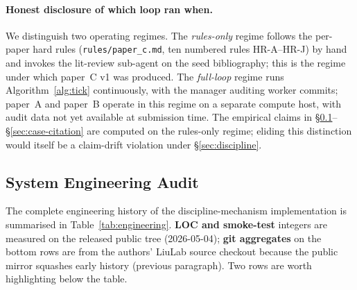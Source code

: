 \paragraph{Honest disclosure of which loop ran when.}
We distinguish two operating regimes. The
\emph{rules-only} regime follows the per-paper hard rules
(\texttt{rules/paper\_c.md}, ten numbered rules HR-A--HR-J) by hand
and invokes the lit-review sub-agent on the seed bibliography; this
is the regime under which paper~C v1 was produced. The
\emph{full-loop} regime runs Algorithm~\ref{alg:tick} continuously,
with the manager auditing worker commits; paper~A and paper~B operate
in this regime on a separate compute host, with audit data not yet
available at submission time. The empirical claims in
\S\ref{sec:case-aggregate}--\S\ref{sec:case-citation} are computed on
the rules-only regime; eliding this distinction would itself be a
claim-drift violation under \S\ref{sec:discipline}.

\subsection{System Engineering Audit}
\label{sec:case-aggregate}

The complete engineering history of the discipline-mechanism
implementation is summarised in Table~\ref{tab:engineering}. \textbf{LOC
and smoke-test} integers are measured on the released public tree (2026-05-04);
\textbf{git aggregates} on the bottom rows are from the authors' LiuLab
source checkout because the public mirror squashes early history (previous
paragraph). Two rows are worth highlighting below the table.

